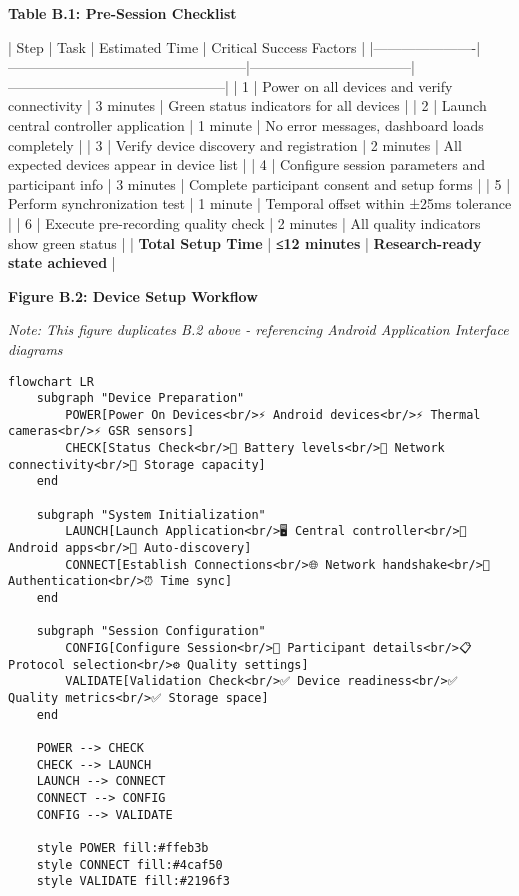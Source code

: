 \documentclass[12pt,a4paper]{article}
\begin{document}
\textbf{Table B.1: Pre-Session Checklist}

| Step                 | Task                                              | Estimated Time                    | Critical Success Factors                      |
|----------------------|---------------------------------------------------|-----------------------------------|-----------------------------------------------|
| 1                    | Power on all devices and verify connectivity      | 3 minutes                         | Green status indicators for all devices       |
| 2                    | Launch central controller application             | 1 minute                          | No error messages, dashboard loads completely |
| 3                    | Verify device discovery and registration          | 2 minutes                         | All expected devices appear in device list    |
| 4                    | Configure session parameters and participant info | 3 minutes                         | Complete participant consent and setup forms  |
| 5                    | Perform synchronization test                      | 1 minute                          | Temporal offset within ±25ms tolerance        |
| 6                    | Execute pre-recording quality check               | 2 minutes                         | All quality indicators show green status      |
| \textbf{Total Setup Time} | \textbf{≤12 minutes}                                   | \textbf{Research-ready state achieved} |

\textbf{Figure B.2: Device Setup Workflow}

\textit{Note: This figure duplicates B.2 above - referencing Android Application Interface diagrams}

\begin{verbatim}
flowchart LR
    subgraph "Device Preparation"
        POWER[Power On Devices<br/>⚡ Android devices<br/>⚡ Thermal cameras<br/>⚡ GSR sensors]
        CHECK[Status Check<br/>📱 Battery levels<br/>📶 Network connectivity<br/>💾 Storage capacity]
    end
    
    subgraph "System Initialization"
        LAUNCH[Launch Application<br/>🖥️ Central controller<br/>📱 Android apps<br/>🔗 Auto-discovery]
        CONNECT[Establish Connections<br/>🌐 Network handshake<br/>🔐 Authentication<br/>⏰ Time sync]
    end
    
    subgraph "Session Configuration"
        CONFIG[Configure Session<br/>👤 Participant details<br/>📋 Protocol selection<br/>⚙️ Quality settings]
        VALIDATE[Validation Check<br/>✅ Device readiness<br/>✅ Quality metrics<br/>✅ Storage space]
    end
    
    POWER --> CHECK
    CHECK --> LAUNCH
    LAUNCH --> CONNECT
    CONNECT --> CONFIG
    CONFIG --> VALIDATE
    
    style POWER fill:#ffeb3b
    style CONNECT fill:#4caf50
    style VALIDATE fill:#2196f3
\end{verbatim}
\end{document}
